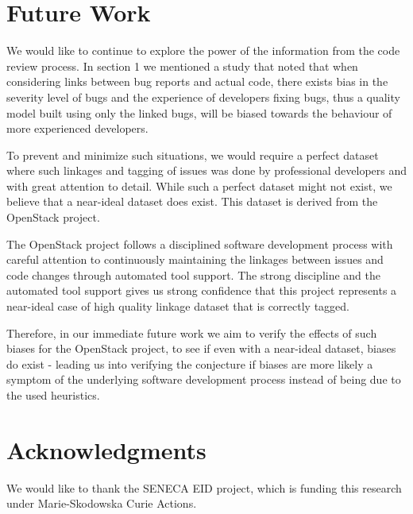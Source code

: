 \documentclass{sig-alternate-05-2015}
\begin{document}
\section{Future Work}
We would like to continue to explore the power of the information from the code review process. 
In section 1 we mentioned a study that noted that when considering links between bug reports and actual 
code, there exists bias in the severity level of bugs and the experience of
developers fixing bugs, thus a quality model built using only the linked 
bugs, will be biased towards the behaviour of more experienced developers.

To prevent and minimize such situations, we would require a perfect dataset where such linkages 
and tagging of issues was done by professional developers and with great attention to detail. 
While such a perfect dataset might not exist, we believe that a near-ideal dataset does exist. 
This dataset is derived from the OpenStack project. 

The OpenStack project follows a disciplined 
software development process with careful attention to continuously maintaining the linkages 
between issues and code changes through automated tool support. The strong discipline and the 
automated tool support gives us strong confidence that this project represents a near-ideal 
case of high quality linkage dataset that is correctly tagged.

Therefore, in our immediate future work we aim to verify the
effects of such biases for the OpenStack project, to see if even with a near-ideal dataset, biases
do exist - leading us into verifying the conjecture if biases are more likely
a symptom of the underlying software development process 
instead of being due to the used heuristics.


\section{Acknowledgments}
We would like to thank the SENECA EID project, which is funding this research under Marie-Skodowska Curie Actions.


\end{document}
